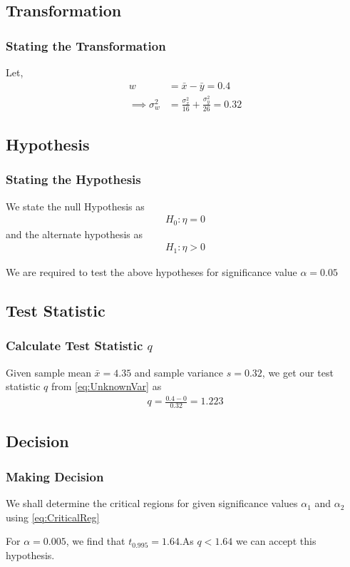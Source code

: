 \documentclass{beamer}
\begin{document}
\subsection{Transformation}
\begin{frame}
    \frametitle{Stating the Transformation}
    Let, 
    \begin{align}
        w &= \bar x - \bar y = 0.4\\ 
        \implies \sigma _w^2 &= \frac{\sigma _x^2}{16} + \frac{\sigma _y^2}{26} = 0.32
    \end{align}
\end{frame}

\subsection{Hypothesis}
\begin{frame}
	\frametitle{Stating the Hypothesis}
	We state the null Hypothesis as
	\begin{align}
		H_0 : \eta = 0
		\label{eq:NullHyp}
	\end{align}
	and the alternate hypothesis as
	\begin{align}
		H_1 : \eta  > 0
		\label{eq:AltHyp}
	\end{align}

	We are required to test the above hypotheses for significance value $\alpha = 0.05$
\end{frame}

\subsection{Test Statistic}
\begin{frame}
	\frametitle{Calculate Test Statistic $q$}
	Given sample mean $\bar{x} =4.35$ and sample variance $s = 0.32 $, we get our test statistic $q$ from
	\eqref{eq:UnknownVar}
	as
	\begin{align}
		q = \frac{0.4 - 0}{0.32} = 1.223
		\label{eq:QVal}
	\end{align}
\end{frame}

\subsection{Decision}
\begin{frame}
	\frametitle{Making Decision}
	We shall determine the critical regions for given significance values $\alpha_1$ and $\alpha_2$ using
	\eqref{eq:CriticalReg}

	For $\alpha = 0.005$, we find that $t_{0.995} = 1.64$.As $q < 1.64$ we can accept this hypothesis.
\end{frame}
\end{document}
